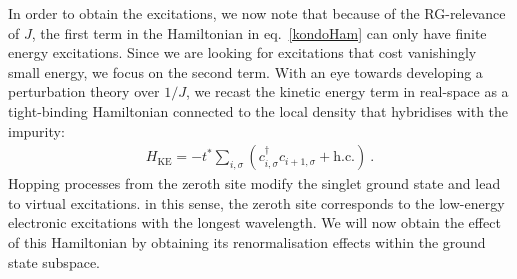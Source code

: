 In order to obtain the excitations, we now note that because of the RG-relevance of \(J\), the first term in the Hamiltonian in eq.~\ref{kondoHam} can only have finite energy excitations. Since we are looking for excitations that cost vanishingly small energy, we focus on the second term. With an eye towards developing a perturbation theory over \(1/J\), we recast the kinetic energy term in real-space as a tight-binding Hamiltonian connected to the local density that hybridises with the impurity:
\begin{equation}\begin{aligned}
	H_\text{KE} = -t^* \sum_{i,\sigma}(c^\dagger_{i,\sigma}c_{i+1,\sigma} + \text{h.c.})~.
\end{aligned}\end{equation}
Hopping processes from the zeroth site modify the singlet ground state and lead to virtual excitations. in this sense, the zeroth site corresponds to the low-energy electronic excitations with the longest wavelength. We will now obtain the effect of this Hamiltonian by obtaining its renormalisation effects within the ground state subspace. 

